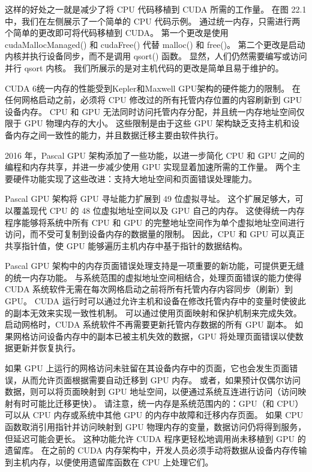 这样的好处之一就是减少了将 CPU 代码移植到 CUDA 所需的工作量。 在图 22.1 中，我们在左侧展示了一个简单的 CPU 代码示例。 通过统一内存，只需进行两个简单的更改即可将代码移植到 CUDA。 第一个更改是使用 cudaMallocManaged() 和 cudaFree() 代替 malloc() 和 free()。 第二个更改是启动内核并执行设备同步，而不是调用 qsort() 函数。 显然，人们仍然需要编写或访问并行 qsort 内核。 我们所展示的是对主机代码的更改是简单且易于维护的。

CUDA 6统一内存的性能受到Kepler和Maxwell GPU架构的硬件能力的限制。 在任何网格启动之前，必须将 CPU 修改过的所有托管内存位置的内容刷新到 GPU 设备内存。 CPU 和 GPU 无法同时访问托管内存分配，并且统一内存地址空间仅限于 GPU 物理内存的大小。 这些限制是由于这些 GPU 架构缺乏支持主机和设备内存之间一致性的能力，并且数据迁移主要由软件执行。

2016 年，Pascal GPU 架构添加了一些功能，以进一步简化 CPU 和 GPU 之间的编程和内存共享，并进一步减少使用 GPU 实现显着加速所需的工作量。 两个主要硬件功能实现了这些改进：支持大地址空间和页面错误处理能力。

Pascal GPU 架构将 GPU 寻址能力扩展到 49 位虚拟寻址。 这个扩展足够大，可以覆盖现代 CPU 的 48 位虚拟地址空间以及 GPU 自己的内存。 这使得统一内存程序能够将系统中所有 CPU 和 GPU 的完整地址空间作为单个虚拟地址空间进行访问，而不受可复制到设备内存的数据量的限制。 因此，CPU 和 GPU 可以真正共享指针值，使 GPU 能够遍历主机内存中基于指针的数据结构。

Pascal GPU 架构中的内存页面错误处理支持是一项重要的新功能，可提供更无缝的统一内存功能。 与系统范围的虚拟地址空间相结合，处理页面错误的能力使得 CUDA 系统软件无需在每次网格启动之前将所有托管内存内容同步（刷新）到 GPU。 CUDA 运行时可以通过允许主机和设备在修改托管内存中的变量时使彼此的副本无效来实现一致性机制。 可以通过使用页面映射和保护机制来完成失效。 启动网格时，CUDA 系统软件不再需要更新托管内存数据的所有 GPU 副本。 如果网格访问设备内存中的副本已被主机失效的数据，GPU 将处理页面错误以使数据更新并恢复执行。

如果 GPU 上运行的网格访问未驻留在其设备内存中的页面，它也会发生页面错误，从而允许页面根据需要自动迁移到 GPU 内存。 或者，如果预计仅偶尔访问数据，则可以将页面映射到 GPU 地址空间，以便通过系统互连进行访问（访问映射有时可能比迁移更快）。 请注意，统一内存是系统范围内的：GPU（和 CPU）可以从 CPU 内存或系统中其他 GPU 的内存中故障和迁移内存页面。 如果 CPU 函数取消引用指针并访问映射到 GPU 物理内存的变量，数据访问仍将得到服务，但延迟可能会更长。 这种功能允许 CUDA 程序更轻松地调用尚未移植到 GPU 的遗留库。 在之前的 CUDA 内存架构中，开发人员必须手动将数据从设备内存传输到主机内存，以便使用遗留库函数在 CPU 上处理它们。

